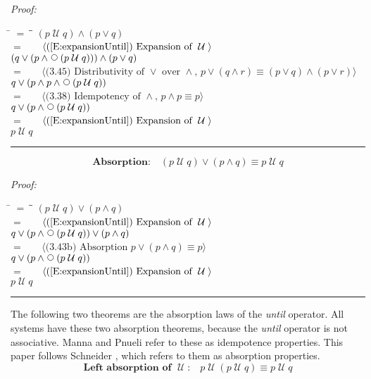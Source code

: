 \documentclass[fleqn, leqno]{article}
\newcommand{\lgap}{2pt}                             %
\newcommand{\mymathindent}{24pt}                    %
\newcommand{\Until}{\;\mathcal{U}\;}
\newcommand{\Next}{\;\,\text{\raisebox{3.5pt}{\circle{6}}}}
\newcommand{\myqed}{\rule[-.23ex]{1.2ex}{2.0ex}}
\newcommand{\myqedtab}{\hspace{388.5pt}}              %
\newcommand{\Gll} {\langle}                         %
\newcommand{\Ggg} {\rangle}                         %
\newcommand{\Hint}[1]     {\ \ \ $\Gll              \mbox{#1} \Ggg$ }   %
\begin{document}
\emph{Proof:}
\begin{tabbing}
\hspace{\mymathindent} \= $= \;$ \= \myqedtab \= \kill
  \> \>   $(p \Until q) \land (p \lor q)$\\[\lgap]
  \> $=$  \>  \Hint{(\ref{E:expansionUntil}) Expansion of $\Until$}\\[\lgap]
  \> \>   $(q \lor (p \land \Next(p \Until q))) \land (p \lor q)$\\[\lgap]
  \> $=$  \>  \Hint{(3.45) Distributivity of $\lor$ over $\land$, $p\lor (q\land r)\equiv (p\lor q)\land (p\lor r)$}\\[\lgap]
  \> \>   $q \lor (p \land p \land \Next(p \Until q))$\\[\lgap]
  \> $=$  \>  \Hint{(3.38) Idempotency of $\land$, $p \land p \equiv p$}\\[\lgap]
  \> \>   $q \lor (p \land \Next(p \Until q))$\\[\lgap]
  \> $=$  \>  \Hint{(\ref{E:expansionUntil}) Expansion of $\Until$}\\[\lgap]
  \> \>   $p \Until q$ \> \myqed
\end{tabbing}

\begin{equation}\label{E:untilOrAnd}
\textbf{Absorption:}\quad (p \Until q) \lor (p \land q) \equiv p \Until q
\end{equation}

\emph{Proof:}
\begin{tabbing}
\hspace{\mymathindent} \= $= \;$ \= \myqedtab \= \kill
  \> \>   $(p \Until q) \lor (p \land q)$\\[\lgap]
  \> $=$  \>  \Hint{(\ref{E:expansionUntil}) Expansion of $\Until$}\\[\lgap]
  \> \>   $q \lor (p \land \Next(p \Until q)) \lor (p \land q)$\\[\lgap]
  \> $=$  \>  \Hint{(3.43b) Absorption $p \lor (p \land q) \equiv p$}\\[\lgap]
  \> \>   $q \lor (p \land \Next(p \Until q))$\\[\lgap]
  \> $=$  \>  \Hint{(\ref{E:expansionUntil}) Expansion of $\Until$}\\[\lgap]
  \> \>   $p \Until q$ \> \myqed
\end{tabbing}

The following two theorems are the absorption laws of the \textit{until} operator.
All systems have these two absorption theorems, because the \textit{until} operator is not associative.
Manna and Pnueli \cite{Manna} refer to these as idempotence properties.
This paper follows Schneider \cite{Schn}, which refers to them as absorption properties.
\begin{equation}\label{E:untilIdem}
\textbf{Left absorption of $\Until$:}\quad p \Until (p \Until q) \equiv p \Until q
\end{equation}
\end{document}
